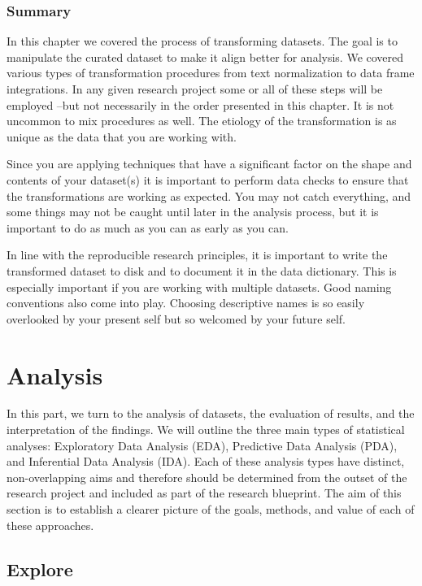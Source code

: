 \documentclass[
  letterpaper,
]{latex/krantz}
\theoremstyle{definition}
\theoremstyle{remark}
\begin{document}
\section*{Summary}\label{summary-6}


In this chapter we covered the process of transforming datasets. The
goal is to manipulate the curated dataset to make it align better for
analysis. We covered various types of transformation procedures from
text normalization to data frame integrations. In any given research
project some or all of these steps will be employed --but not
necessarily in the order presented in this chapter. It is not uncommon
to mix procedures as well. The etiology of the transformation is as
unique as the data that you are working with.

Since you are applying techniques that have a significant factor on the
shape and contents of your dataset(s) it is important to perform data
checks to ensure that the transformations are working as expected. You
may not catch everything, and some things may not be caught until later
in the analysis process, but it is important to do as much as you can as
early as you can.

In line with the reproducible research principles, it is important to
write the transformed dataset to disk and to document it in the data
dictionary. This is especially important if you are working with
multiple datasets. Good naming conventions also come into play. Choosing
descriptive names is so easily overlooked by your present self but so
welcomed by your future self.

\part{Analysis}

In this part, we turn to the analysis of datasets, the evaluation of
results, and the interpretation of the findings. We will outline the
three main types of statistical analyses: Exploratory Data Analysis
(EDA), Predictive Data Analysis (PDA), and Inferential Data Analysis
(IDA). Each of these analysis types have distinct, non-overlapping aims
and therefore should be determined from the outset of the research
project and included as part of the research blueprint. The aim of this
section is to establish a clearer picture of the goals, methods, and
value of each of these approaches.

\chapter{Explore}\label{sec-explore-chapter}
\end{document}
